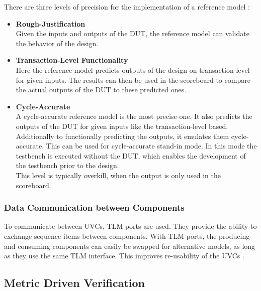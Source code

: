 There are three levels of precision for the implementation of a reference model \cite{cdnshelp}:

\begin{itemize}
  \item \textbf{Rough-Justification}\\
  Given the inputs and outputs of the DUT, the reference model can validate the behavior of the design.
  \item \textbf{Transaction-Level Functionality}\\
  Here the reference model predicts outputs of the design on transaction-level for given inputs.
  The results can then be used in the scoreboard to compare the actual outputs of the DUT to these predicted ones. 
  \item \textbf{Cycle-Accurate}\\
  A cycle-accurate reference model is the most precise one. 
  It also predicts the outputs of the DUT for given inputs like the transaction-level based.
  Additionally to functionally predicting the outputs, it emulates them cycle-accurate.
  This can be used for cycle-accurate stand-in mode.
  In this mode the testbench is executed without the DUT, which enables the development of the testbench prior to the design.\\
  This level is typically overkill, when the output is only used in the scoreboard.
\end{itemize}

\subsubsection{Data Communication between Components}\label{tlm}

To communicate between UVCs, TLM ports are used.
They provide the ability to exchange sequence items between components.
With TLM ports, the producing and consuming components can easily be swapped for alternative models, as long as they use the same TLM interface.
This improves re-usability of the UVCs \cite{uvm_sv}.

\subsection{Metric Driven Verification}

